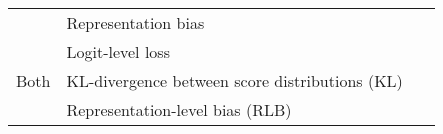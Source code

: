 \begin{table*}[htbp]
\begin{tabular}{lll}
             & Representation bias~\cite{Resound, Repair}                                                                                                                                                          &  \\
             & Logit-level loss~\cite{CAI_rz,UAI_rz}                                                                                                                                                               &  \\
             \midrule
Both         & KL-divergence between score distributions (KL)~\cite{divergence_between_score_distributions,DP_difference_fpr_GAN_debiasing}                                                                        &  \\
             & Representation-level bias (RLB)~\cite{RLB}                                                                                                                                                          & \\
             \bottomrule
\end{tabular}
\end{table*}




